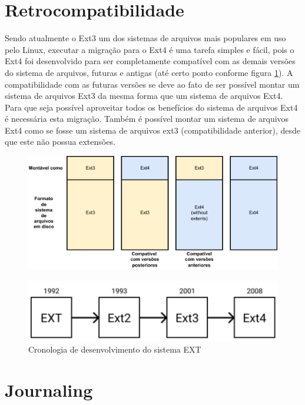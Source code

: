 \documentclass[
	12pt,				%
	openright,			%
	oneside,			%
	a4paper,			%
	chapter=TITLE,		%
	english,			%
	french,				%
	spanish,			%
	brazil				%
	]{abntex2}
\theoremstyle{definition}
\begin{document}
\section{Retrocompatibilidade}

Sendo atualmente o Ext3 um dos sistemas de arquivos mais populares em uso pelo Linux, executar a migração para o Ext4 é 
uma tarefa simples e fácil, pois o Ext4 foi desenvolvido para ser completamente compatível com as demais versões do sistema 
de arquivos, futuras e antigas (até certo ponto conforme figura \ref{fig:3-4}). A compatibilidade com as futuras versões se deve ao 
fato de ser possível montar um sistema de arquivos Ext3 da mesma forma que um sistema de arquivos Ext4. Para que seja possível 
aproveitar todos os benefícios do sistema de arquivos Ext4 é necessária esta migração. Também é possível montar um sistema de 
arquivos Ext4 como se fosse um sistema de arquivos ext3 (compatibilidade anterior), desde que este não possua extensões.



\begin{figure}[H]
	\centering
	\includegraphics[width=1.0\textwidth]{3-4.pdf}
	\caption{}
	\label{fig:3-4}
\end{figure}

\begin{figure}[H]
	\centering
	\includegraphics[width=1.0\textwidth]{ext.png}
	\caption{Cronologia de desenvolvimento do sistema EXT}
	\label{fig:ext}
\end{figure}

\section{Journaling}
\end{document}
